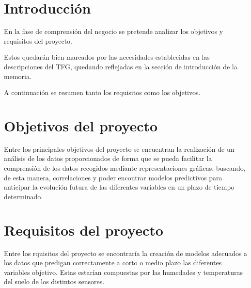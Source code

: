
\section{Introducción}
En la fase de comprensión del negocio se pretende analizar los objetivos y requisitos del 
proyecto.

Estos quedarán bien marcados por las necesidades establecidas en las descripciones
del TFG, quedando reflejadas en la sección de introducción de la memoria.

A continuación se resumen tanto los requisitos como los objetivos.

\section{Objetivos del proyecto}
Entre los principales objetivos del proyecto se encuentran la realización de un análisis
de los datos proporcionados de forma que se pueda facilitar la comprensión de los
datos recogidos mediante representaciones gráficas, buscando, de esta manera, correlaciones
y poder encontrar modelos predictivos para anticipar la evolución futura de las 
diferentes variables en un plazo de tiempo determinado.

\section{Requisitos del proyecto}
Entre los rquisitos del proyecto se encontraría la creación de modelos adecuados a los datos
que predigan correctamente a corto o medio plazo las diferentes variables objetivo.
Estas estarían compuestas por las humedades y temperaturas del suelo de los distintos sensores.
